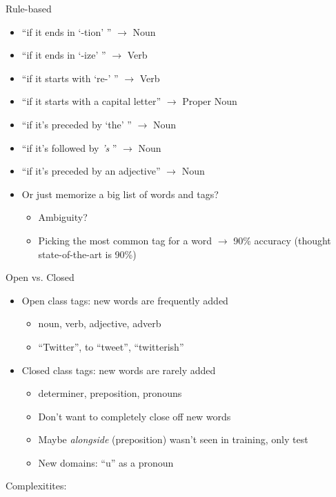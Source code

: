 \documentclass[11pt,letterpaper]{article}
\begin{document}
Rule-based

\begin{itemize}
  \item ``if it ends in `-tion' '' $\rightarrow$ Noun
  \item ``if it ends in `-ize' '' $\rightarrow$ Verb
  \item ``if it starts with `re-' '' $\rightarrow$ Verb
  \item ``if it starts with a capital letter'' $\rightarrow$ Proper Noun
  \item ``if it's preceded by `the' '' $\rightarrow$ Noun
  \item ``if it's followed by \textit{'s} '' $\rightarrow$ Noun
  \item ``if it's preceded by an adjective'' $\rightarrow$ Noun
  \item Or just memorize a big list of words and tags?
    \begin{itemize}
      \item Ambiguity?
      \item Picking the most common tag for a word $\rightarrow$ 90\% accuracy (thought state-of-the-art is 90\%)
    \end{itemize}
\end{itemize}

Open vs. Closed

\begin{itemize}
  \item Open class tags: new words are frequently added
    \begin{itemize}
      \item noun, verb, adjective, adverb
      \item ``Twitter'', to ``tweet'', ``twitterish''
    \end{itemize}
  \item Closed class tags: new words are rarely added
    \begin{itemize}
      \item determiner, preposition, pronouns
      \item Don't want to completely close off new words
      \item Maybe \textit{alongside} (preposition) wasn't seen in training, only test
      \item New domains: ``u'' as a pronoun
    \end{itemize}
\end{itemize}

Complexitites:
\end{document}
